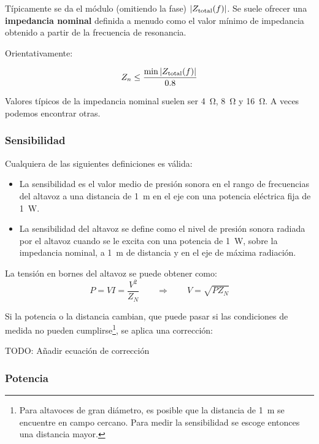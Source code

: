 \documentclass[12pt, a4paper]{article}
\begin{document}
Típicamente se da el módulo (omitiendo la fase) $\abs{Z _{\text{total}}(f)}$. Se suele ofrecer una \textbf{impedancia nominal} definida a menudo como el valor mínimo de impedancia obtenido a partir de la frecuencia de resonancia.

Orientativamente:

\begin{equation} \label{eq:impedancia_nominal}
  Z _n \leq \frac{\min \abs{ Z _{\text{total}}(f)} }{0.8}
\end{equation}

Valores típicos de la impedancia nominal suelen ser \qty{4}{\ohm}, \qty{8}{\ohm} y \qty{16}{\ohm}. A veces podemos encontrar otras.

\subsubsection{Sensibilidad}

Cualquiera de las siguientes definiciones es válida:
\begin{itemize}
  \item \color{blue} La sensibilidad es el valor medio de presión sonora en el rango de frecuencias del altavoz a una distancia de \qty{1}{\meter} en el eje con una potencia eléctrica fija de \qty{1}{\watt}. \color{black}
  \item \color{blue} La sensibilidad del altavoz se define como el nivel de presión sonora radiada por el altavoz cuando se le excita con una potencia de \qty{1}{\watt}, sobre la impedancia nominal, a \qty{1}{\meter} de
        distancia y en el eje de máxima radiación. \color{black}
\end{itemize}



La tensión en bornes del altavoz se puede obtener como:
\[ P = V  I = \frac{V^2}{Z_N} \qquad \Longrightarrow \qquad V = \sqrt{P   Z_N} \]

Si la potencia o la distancia cambian, que puede pasar si las condiciones de medida no pueden cumplirse\footnote{Para altavoces de gran diámetro, es posible que la distancia de \qty{1}{\meter} se encuentre en campo cercano. Para medir la sensibilidad se escoge entonces una distancia mayor.}, se aplica una corrección:

TODO: Añadir ecuación de corrección

\subsubsection{Potencia}
\end{document}
